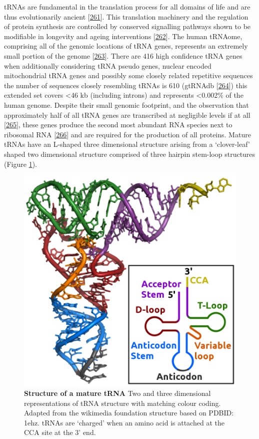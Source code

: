 \documentclass[
]{book}
\begin{document}
tRNAs are fundamental in the translation process for all domains of life and are thus evolutionarily ancient {[}\protect\hyperlink{ref-Eigen1989}{261}{]}.
This translation machinery and the regulation of protein synthesis are controlled by conserved signalling pathways shown to be modifiable in longevity and ageing interventions {[}\protect\hyperlink{ref-Tavernarakis2008}{262}{]}.
The human tRNAome, comprising all of the genomic locations of tRNA genes, represents an extremely small portion of the genome {[}\protect\hyperlink{ref-Parisien2013}{263}{]}.
There are 416 high confidence tRNA genes when additionally considering tRNA pseudo genes, nuclear encoded mitochondrial tRNA genes and possibly some closely related repetitive sequences the number of sequences closely resembling tRNAs is 610 (gtRNAdb {[}\protect\hyperlink{ref-Chan2009}{264}{]}) this extended set covers \textless46 kb (including introns) and represents \textless0.002\% of the human genome.
Despite their small genomic footprint, and the observation that approximately half of all tRNA genes are transcribed at negligible levels if at all {[}\protect\hyperlink{ref-Torres2019a}{265}{]}, these genes produce the second most abundant RNA species next to ribosomal RNA {[}\protect\hyperlink{ref-Lodish2000}{266}{]} and are required for the production of all proteins.
Mature tRNAs have an L-shaped three dimensional structure arising from a `clover-leaf' shaped two dimensional structure comprised of three hairpin stem-loop structures (Figure \ref{fig:tRNAstructure}).

\begin{figure}

{\centering \includegraphics[width=0.7\linewidth]{./figs/910px-TRNA-Phe_yeast_1ehz_RJA_white} 

}

\caption{\textbf{Structure of a mature tRNA} Two and three dimensional representations of tRNA structure with matching colour coding. Adapted from the wikimedia foundation structure based on PDBID: 1ehz. tRNAs are `charged' when an amino acid is attached at the CCA site at the 3' end.}\label{fig:tRNAstructure}
\end{figure}
\end{document}
